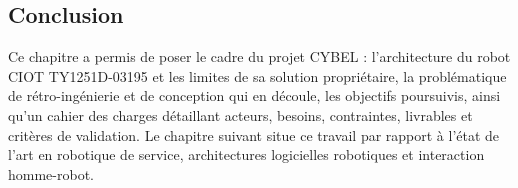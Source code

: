 \subsection{Conclusion}

Ce chapitre a permis de poser le cadre du projet CYBEL : l'architecture du
robot CIOT TY1251D-03195 et les limites de sa solution propriétaire, la
problématique de rétro-ingénierie et de conception qui en découle, les
objectifs poursuivis, ainsi qu'un cahier des charges détaillant acteurs,
besoins, contraintes, livrables et critères de validation. Le chapitre
suivant situe ce travail par rapport à l'état de l'art en robotique de
service, architectures logicielles robotiques et interaction homme-robot.